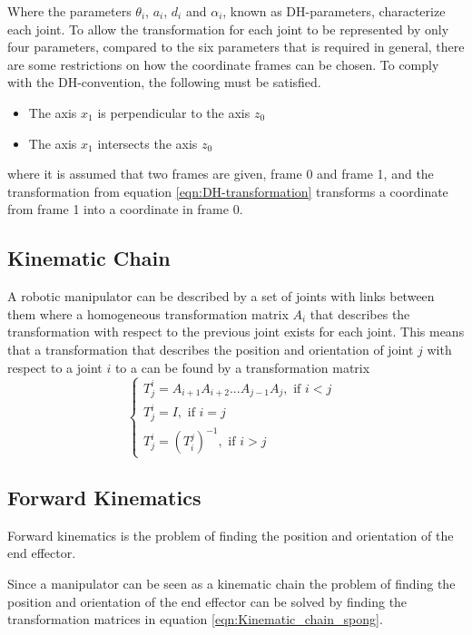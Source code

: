 Where the parameters \(\theta_i\), \(a_i\), \(d_i\) and \(\alpha_i\), known as DH-parameters, characterize each joint. To allow the transformation for each joint to be represented by only four parameters, compared to the six parameters that is required in general, there are some restrictions on how the coordinate frames can be chosen. To comply with the DH-convention, the following must be satisfied.
\begin{itemize}
    \item The axis \(x_{1}\) is perpendicular to the axis \(z_0\)
    \item The axis \(x_{1}\) intersects the axis \(z_0\)
\end{itemize}
where it is assumed that two frames are given, frame 0 and frame 1, and the transformation from equation \ref{eqn:DH-transformation} transforms a coordinate from frame 1 into a coordinate in frame 0.\cite{spong}



\subsection*{Kinematic Chain} %
A robotic manipulator can be described by a set of joints with links between them where a homogeneous transformation matrix \(A_i\) that describes the transformation with respect to the previous joint exists for each joint. This means that a transformation that describes the position and orientation of joint \(j\) with respect to a joint \(i\) to a can be found by a transformation matrix \cite{spong}
\begin{equation}
    \begin{cases}
        T_j^i = A_{i+1}A_{i+2}...A_{j-1}A_{j}, \text{  if \(i < j\) } \\
        T_j^i = I, \text{  if \(i = j\) } \\
        T_j^i = (T_i^j)^{-1}, \text{  if \(i > j\) }
    \end{cases}
    \label{eqn:Kinematic_chain_spong}
\end{equation}



\subsection*{Forward Kinematics}
Forward kinematics is the problem of finding the position and orientation of the end effector.

Since a manipulator can be seen as a kinematic chain the problem of finding the position and orientation of the end effector can be solved by finding the transformation matrices in equation \ref{eqn:Kinematic_chain_spong}.



